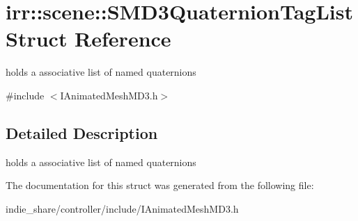 \hypertarget{structirr_1_1scene_1_1SMD3QuaternionTagList}{}\section{irr\+:\+:scene\+:\+:S\+M\+D3\+Quaternion\+Tag\+List Struct Reference}
\label{structirr_1_1scene_1_1SMD3QuaternionTagList}


holds a associative list of named quaternions  




{\ttfamily \#include $<$I\+Animated\+Mesh\+M\+D3.\+h$>$}



\subsection{Detailed Description}
holds a associative list of named quaternions 

The documentation for this struct was generated from the following file\+:\begin{DoxyCompactItemize}
\item 
indie\+\_\+share/controller/include/I\+Animated\+Mesh\+M\+D3.\+h\end{DoxyCompactItemize}
